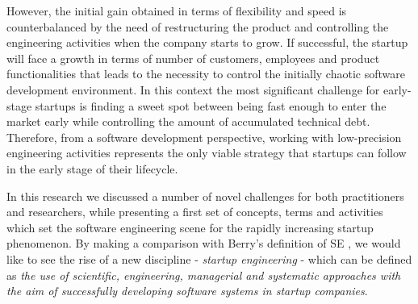 \documentclass[10pt,journal,letterpaper,compsoc]{IEEEtran}
\begin{document}
However, the initial gain obtained in terms of flexibility and speed is
counterbalanced by the need of restructuring the product and controlling the
engineering activities when the company starts to grow. If successful, the
startup will face a growth in terms of number of customers, employees and
product functionalities that leads to the necessity to control the initially
chaotic software development environment. In this context the most significant
challenge for early-stage startups is finding a sweet spot between being fast
enough to enter the market early while controlling the amount of accumulated
technical debt.  %
Therefore, from a software development perspective, working with low-precision  
engineering activities represents the only viable strategy that startups can  
follow in the early stage of their lifecycle.

In this research we discussed a number of novel challenges for both
practitioners and researchers, while presenting a first set of concepts, terms
and activities which set the software engineering scene for the rapidly
increasing startup phenomenon. By making a comparison with Berry's definition of
SE \cite{Berry1992}, we would like to see the rise of a new discipline -
\textit{startup engineering} - which can be defined as  \textit{the use of
scientific, engineering, managerial and systematic approaches with the aim of
successfully developing software systems in startup companies}. %


%
\end{document}
